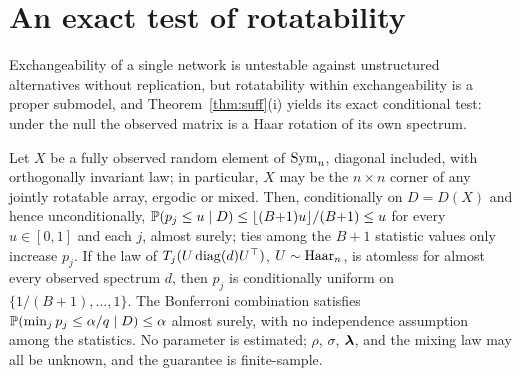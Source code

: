 \section{An exact test of rotatability}
\label{sec:test}

Exchangeability of a single network is untestable against
unstructured alternatives without replication, but rotatability within exchangeability is a proper submodel, and Theorem~\ref{thm:suff}(i)
yields its exact conditional test: under the null the observed matrix
is a Haar rotation of its own spectrum.

\begin{center}
\end{center}

\begin{theorem}
\label{thm:test}
Let $X$ be a fully observed random element of $\mathrm{Sym}_n$, diagonal
included, with orthogonally invariant law; in particular, $X$ may be
the $n\times n$ corner of any jointly rotatable array, ergodic or
mixed. Then, conditionally on $D=D(X)$ and hence unconditionally,
$\mathbb{P}(p_j\le u\mid D)\le\lfloor(B{+}1)u\rfloor/(B{+}1)\le u$ for
every $u\in[0,1]$ and each $j$, almost surely; ties among the $B+1$
statistic values only increase $p_j$. If the law of $T_j(U\operatorname{diag}(d)U^\top)$, $U\sim\mathrm{Haar}_n$, is
atomless for almost every observed spectrum $d$, then $p_j$ is
conditionally uniform on $\{1/(B{+}1),\dots,1\}$. The Bonferroni
combination satisfies
$\mathbb{P}(\min_jp_j\le\alpha/q\mid D)\le\alpha$ almost surely, with no
independence assumption among the statistics. No parameter is
estimated; $\rho$, $\sigma$, $\bm{\lambda}$, and the mixing law may all be
unknown, and the guarantee is finite-sample.
\end{theorem}

